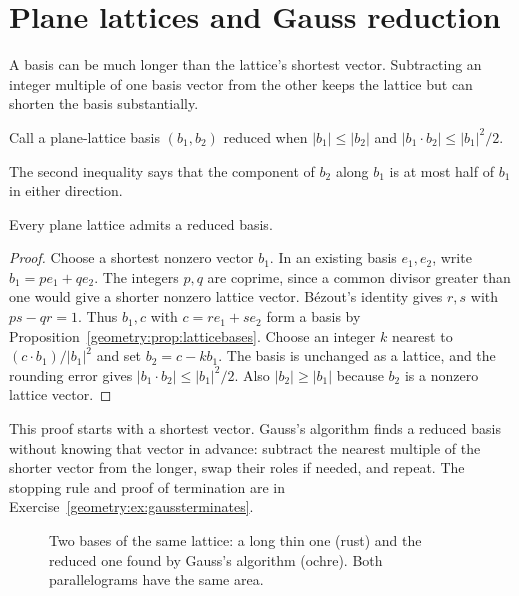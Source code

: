 \section{Plane lattices and Gauss reduction}

A basis can be much longer than the lattice's shortest vector.
Subtracting an integer multiple of one basis vector from the other keeps
the lattice but can shorten the basis substantially.

\begin{definition}
Call a plane-lattice basis $(b_1,b_2)$ reduced when
$|b_1|\le|b_2|$ and $|b_1\cdot b_2|\le|b_1|^2/2$.
\end{definition}

The second inequality says that the component of $b_2$ along $b_1$
is at most half of $b_1$ in either direction.

\begin{proposition}\label{geometry:prop:reducedexists}
Every plane lattice admits a reduced basis.
\end{proposition}
\begin{proof}
Choose a shortest nonzero vector $b_1$. In an existing basis $e_1,e_2$,
write $b_1=pe_1+qe_2$. The integers $p,q$ are coprime, since a common
divisor greater than one would give a shorter nonzero lattice vector.
B\'ezout's identity gives $r,s$ with $ps-qr=1$.
Thus $b_1,c$ with $c=re_1+se_2$ form a basis by
Proposition~\ref{geometry:prop:latticebases}.
Choose an integer $k$ nearest to $(c\cdot b_1)/|b_1|^2$ and set
$b_2=c-kb_1$. The basis is unchanged as a lattice, and the rounding
error gives $|b_1\cdot b_2|\le|b_1|^2/2$.
Also $|b_2|\ge|b_1|$ because $b_2$ is a nonzero lattice vector.
\end{proof}

This proof starts with a shortest vector. Gauss's algorithm finds a
reduced basis without knowing that vector in advance: subtract the
nearest multiple of the shorter vector from the longer, swap their roles
if needed, and repeat. The stopping rule and proof of termination are
in Exercise~\ref{geometry:ex:gaussterminates}.

\begin{figure}[ht]
\centering
{}
\caption{Two bases of the same lattice: a long thin one (rust) and the reduced one found by Gauss's algorithm (ochre). Both parallelograms have the same
area.}
\label{geometry:fig:reduction}
\end{figure}

